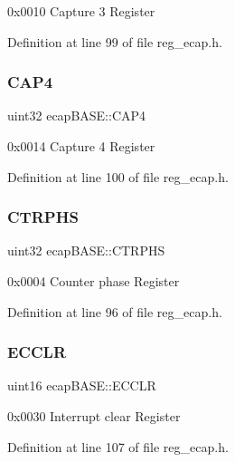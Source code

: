 0x0010 Capture 3 Register 

Definition at line 99 of file reg\+\_\+ecap.\+h.

\mbox{\label{structecapBASE_a841215fcded187c745e42a07d895f4d1}} 
\subsubsection{\texorpdfstring{C\+A\+P4}{CAP4}}
{\footnotesize\ttfamily uint32 ecap\+B\+A\+S\+E\+::\+C\+A\+P4}

0x0014 Capture 4 Register 

Definition at line 100 of file reg\+\_\+ecap.\+h.

\mbox{\label{structecapBASE_a5834c54556875dc112d0d056f80a2d84}} 
\subsubsection{\texorpdfstring{C\+T\+R\+P\+HS}{CTRPHS}}
{\footnotesize\ttfamily uint32 ecap\+B\+A\+S\+E\+::\+C\+T\+R\+P\+HS}

0x0004 Counter phase Register 

Definition at line 96 of file reg\+\_\+ecap.\+h.

\mbox{\label{structecapBASE_a618822a04289061e3283a6b2e7096b11}} 
\subsubsection{\texorpdfstring{E\+C\+C\+LR}{ECCLR}}
{\footnotesize\ttfamily uint16 ecap\+B\+A\+S\+E\+::\+E\+C\+C\+LR}

0x0030 Interrupt clear Register 

Definition at line 107 of file reg\+\_\+ecap.\+h.

\mbox{\label{structecapBASE_a0869d5446fa48a235df4d3dcb7110697}} 
